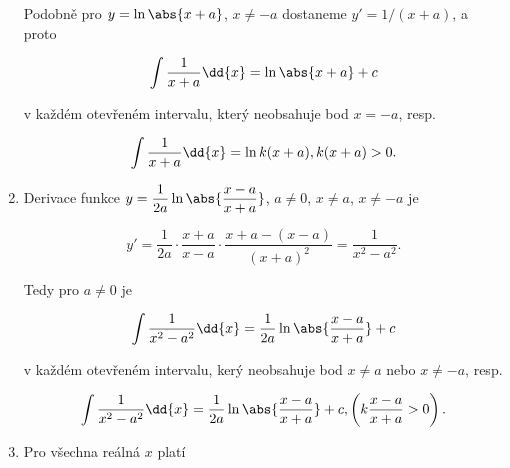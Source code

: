 \begin{enumerate}
            Podobně pro \(y=\ln\abs{x+a}\), \(x\neq-a\) dostaneme \(y'=1/(x+a)\), a proto
            \begin{fleqn}[\parindent]
              \begin{equation*}
                \int\frac{1}{x+a}\dd{x} = \ln\abs{x+a} + c
              \end{equation*}
            \end{fleqn} 
            v každém otevřeném intervalu, který neobsahuje bod \(x=-a\), resp. 
            \begin{fleqn}[\parindent]
              \begin{equation*}
                \int\frac{1}{x+a}\dd{x} = \ln k(x+a), \hfill k(x+a)>0.
              \end{equation*}
            \end{fleqn} 
      \item Derivace funkce \(y=\dfrac{1}{2a}\ln\abs{\dfrac{x-a}{x+a}}\), \(a\neq0\), \(x\neq a\),
            \(x\neq -a\) je
            \begin{fleqn}[\parindent]
              \begin{equation*}
                y'=\frac{1}{2a}\cdot\frac{x+a}{x-a}\cdot\frac{x+a-(x-a)}{(x+a)^2} 
                  = \frac{1}{x^2-a^2}.
              \end{equation*}
            \end{fleqn} 
            Tedy pro \(a\neq0\) je
            \begin{fleqn}[\parindent]
              \begin{equation*}
                \int\frac{1}{x^2-a^2}\dd{x} = \frac{1}{2a}\ln\abs{\dfrac{x-a}{x+a}} + c
              \end{equation*}
            \end{fleqn} 
            v každém otevřeném intervalu, kerý neobsahuje bod \(x\neq a\) nebo \(x\neq -a\), resp.
            \begin{fleqn}[\parindent] 
              \begin{equation*}
                \int\frac{1}{x^2-a^2}\dd{x} = \frac{1}{2a}\ln\abs{\dfrac{x-a}{x+a}} + c,
                \hfill \left(k\dfrac{x-a}{x+a}>0\right).
              \end{equation*}
            \end{fleqn} 
      \item Pro všechna reálná \(x\) platí
            \begin{fleqn}[\parindent]      
              \begin{equation*}

\end{equation*}
\end{fleqn}
\end{enumerate}
